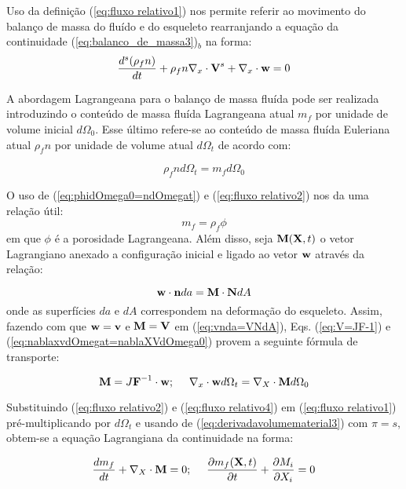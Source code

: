 \documentclass[
	11pt, %
	fleqn, %
	a4paper, %
]{LegrandOrangeBook}
\begin{document}
Uso da definição (\ref{eq:fluxo relativo1}) nos permite referir ao movimento do balanço de massa do fluído e do esqueleto rearranjando a equação da continuidade (\ref{eq:balanco_de_massa3})$_b$ na forma:
\begin{equation}
	\label{eq:fluxo relativo1}	
	\dfrac{d^s(\rho_fn)}{dt}+\rho_fn\nabla_x \cdot \textbf{V}^s + \nabla_x \cdot \textbf{w} = 0 
\end{equation}

A abordagem Lagrangeana para o balanço de massa fluída pode ser realizada introduzindo o conteúdo de massa fluída Lagrangeana atual $m_f$ por unidade de volume inicial $d\Omega_0$. Esse último refere-se ao conteúdo de massa fluída Euleriana atual $\rho_fn$ por unidade de volume atual $d\Omega_t$ de acordo com:

\begin{equation}
	\label{eq:fluxo relativo2}	
	\rho_f n d\Omega_t = m_f d\Omega_0
\end{equation}

O uso de (\ref{eq:phidOmega0=ndOmegat}) e (\ref{eq:fluxo relativo2}) nos da uma relação útil:
\begin{equation}
	\label{eq:fluxo relativo3}	
	m_f = \rho_f \phi
\end{equation}
em que $\phi$ é a porosidade Lagrangeana. Além disso, seja $\textbf{M}(\textbf{X},t)$ o vetor Lagrangiano anexado a configuração inicial e ligado ao vetor $\textbf{w}$ através da relação:

\begin{equation}
	\label{eq:fluxo relativo3}	
	\textbf{w} \cdot \textbf{n} da = \textbf{M} \cdot \textbf{N} dA
\end{equation}
onde as superfícies $da$ e $dA$ correspondem na deformação do esqueleto. Assim, fazendo com que $\textbf{w}=\textbf{v}$ e $\textbf{M} = \textbf{V}$ em (\ref{eq:vnda=VNdA}), Eqs. (\ref{eq:V=JF-1}) e (\ref{eq:nablaxvdOmegat=nablaXVdOmega0}) provem a seguinte fórmula de transporte:

\begin{equation}
	\label{eq:fluxo relativo4}	
	\textbf{M} = J\textbf{F}^{-1} \cdot \textbf{w};~~~~ \nabla_x \cdot \textbf{w} d\Omega_t = \nabla_X \cdot \textbf{M} d\Omega_0
\end{equation}

Substituindo (\ref{eq:fluxo relativo2}) e (\ref{eq:fluxo relativo4}) em (\ref{eq:fluxo relativo1}) pré-multiplicando por $d\Omega_t$ e usando de (\ref{eq:derivadavolumematerial3}) com $\pi = s$, obtem-se a equação Lagrangiana da continuidade na forma:

\begin{equation}
	\label{eq:fluxo relativo5}	
	\dfrac{dm_f}{dt} + \nabla_X \cdot \textbf{M} = 0; ~~~~ \dfrac{\partial m_f(\textbf{X},t)}{\partial t} + \dfrac{\partial M_i}{\partial X_i} = 0
\end{equation}
\end{document}
